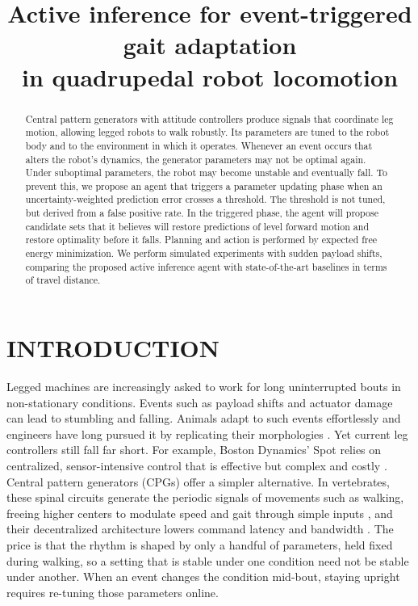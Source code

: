 \documentclass[letterpaper, 10 pt, conference]{ieeeconf}  %
\title{\LARGE \bf
Active inference for event-triggered gait adaptation\\ in quadrupedal robot locomotion
}
\begin{document}
\maketitle
\thispagestyle{empty}
\pagestyle{empty}

\begin{abstract}
Central pattern generators with attitude controllers produce signals that coordinate leg motion, allowing legged robots to walk robustly. Its parameters are tuned to the robot body and to the environment in which it operates. Whenever an event occurs that alters the robot's dynamics, the generator parameters may not be optimal again. Under suboptimal parameters, the robot may become unstable and eventually fall. To prevent this, we propose an agent that triggers a parameter updating phase when an uncertainty-weighted prediction error crosses a threshold. The threshold is not tuned, but derived from a false positive rate. In the triggered phase, the agent will propose candidate sets that it believes will restore predictions of level forward motion and restore optimality before it falls. Planning and action is performed by expected free energy minimization. We perform simulated experiments with sudden payload shifts, comparing the proposed active inference agent with state-of-the-art baselines in terms of travel distance. 
\end{abstract}

\section{INTRODUCTION}
\label{sec:introduction}

Legged machines are increasingly asked to work for long uninterrupted bouts in non-stationary conditions. Events such as payload shifts and actuator damage can lead to stumbling and falling.
Animals adapt to such events effortlessly and engineers have long pursued it by replicating their morphologies \cite{pettersen2017snake, dwivedula2025configbot}. Yet current leg controllers still fall far short. For example, Boston Dynamics' Spot relies on centralized, sensor-intensive control that is effective but complex and costly \cite{dwivedula2025configbot}.
Central pattern generators (CPGs) offer a simpler alternative.
In vertebrates, these spinal circuits generate the periodic signals of movements such as walking, freeing higher centers to modulate speed and gait through simple inputs \cite{goulding2009circuits, dickinson2000how}, and their decentralized architecture lowers command latency and bandwidth \cite{ijspeert2008special}.
The price is that the rhythm is shaped by only a handful of parameters, held fixed during walking, so a setting that is stable under one condition need not be stable under another.
When an event changes the condition mid-bout, staying upright requires re-tuning those parameters online.
\end{document}
